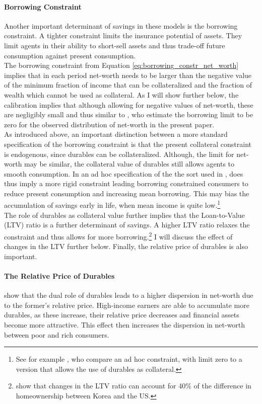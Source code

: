 \documentclass[a4paper,12pt,legno]{article}
\begin{document}
\paragraph{Borrowing Constraint} Another important determinant of savings in these models is the borrowing constraint. A tighter constraint limits the insurance potential of assets. They limit agents in their ability to short-sell assets and thus trade-off future consumption against present consumption. \\ 
The borrowing constraint from Equation \ref{eq:borrowing_constr_net_worth} implies that in each period net-worth needs to be larger than the negative value of the minimum fraction of income that can be collateralized and the fraction of wealth which cannot be used as collateral. As I will show further below, the calibration implies that although allowing for negative values of net-worth, these are negligibly small and thus similar to \cite{hintermaier2011}, who estimate the borrowing limit to be zero for the observed distribution of net-worth in the present paper. 
\\ 
As introduced above, an important distinction between a more standard specification of the borrowing constraint is that the present collateral constraint is endogenous, since durables can be collateralized. Although, the limit for net-worth may be similar, the collateral value of durables still allows agents to smooth consumption. In an ad hoc specification of the the sort used in \cite{hintermaier2011}, does thus imply a more rigid constraint leading borrowing constrained consumers to reduce present consumption and increasing mean borrowing. This may bias the accumulation of savings early in life, when mean income is quite low.\footnote{See for example \cite{FV&K2011}, who compare an ad hoc constraint, with limit zero to a version that allows the use of durables as collateral.} \\ The role of durables as collateral value further implies that the Loan-to-Value (LTV) ratio is a further determinant of savings. A higher LTV ratio relaxes the constraint and thus allows for more borrowing.\footnote{\cite{cho2012accounting} show that changes in the LTV ratio can account for 40\% of the difference in homeownership between Korea and the US.} I will discuss the effect of changes in the LTV further below.
Finally, the relative price of durables is also important.

\paragraph{The Relative Price of Durables} \cite{FV&K2011} show that the dual role of durables leads to a higher dispersion in net-worth due to the former's relative price. High-income earners are able to accumulate more durables, as these increase, their relative price decreases and financial assets become more attractive. This effect then increases the dispersion in net-worth between poor and rich consumers. 
\end{document}

